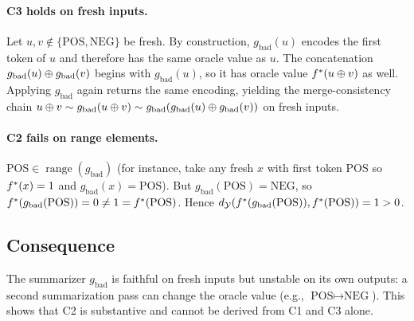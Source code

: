 \paragraph{C3 holds on fresh inputs.}
Let $u,v \notin \{\text{POS},\text{NEG}\}$ be fresh. By construction, $g_{\mathrm{bad}}(u)$ encodes the first token of $u$ and therefore has the same oracle value as $u$. The concatenation $g_{\mathrm{bad}}(u)\oplus g_{\mathrm{bad}}(v)$ begins with $g_{\mathrm{bad}}(u)$, so it has oracle value $f^\ast(u\oplus v)$ as well. Applying $g_{\mathrm{bad}}$ again returns the same encoding, yielding the merge-consistency chain $u \oplus v \sim g_{\mathrm{bad}}(u \oplus v) \sim g_{\mathrm{bad}}(g_{\mathrm{bad}}(u) \oplus g_{\mathrm{bad}}(v))$ on fresh inputs.

\paragraph{C2 fails on range elements.}
$\text{POS} \in \operatorname{range}(g_{\mathrm{bad}})$ (for instance, take any fresh $x$ with first token $\text{POS}$ so $f^\ast(x)=1$ and $g_{\mathrm{bad}}(x)=\text{POS}$). But $g_{\mathrm{bad}}(\text{POS})=\text{NEG}$, so $f^\ast(g_{\mathrm{bad}}(\text{POS}))=0\neq 1=f^\ast(\text{POS})$. Hence $d_{\mathcal{Y}}(f^\ast(g_{\mathrm{bad}}(\text{POS})), f^\ast(\text{POS})) = 1 > 0$.

\subsection{Consequence}

The summarizer $g_{\mathrm{bad}}$ is faithful on fresh inputs but unstable on its own outputs: a second summarization pass can change the oracle value (e.g., $\text{POS} \mapsto \text{NEG}$). This shows that C2 is substantive and cannot be derived from C1 and C3 alone.
